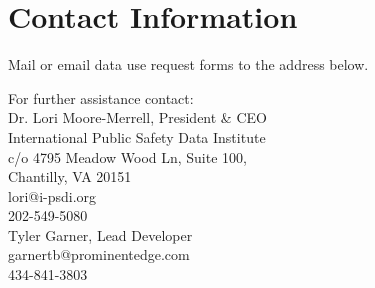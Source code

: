 \documentclass[12pt,oneside]{book}
\begin{document}
\chapter{Contact Information}

Mail or email data use request forms to the address below.

For further assistance contact:\\

Dr. Lori Moore-Merrell, President \& CEO \\
International Public Safety Data Institute \\
c/o 4795 Meadow Wood Ln, Suite 100, \\
Chantilly, VA 20151 \\
lori@i-psdi.org \\
202-549-5080 \\


Tyler Garner, Lead Developer \\
garnertb@prominentedge.com \\
434-841-3803 \\



\end{document}
